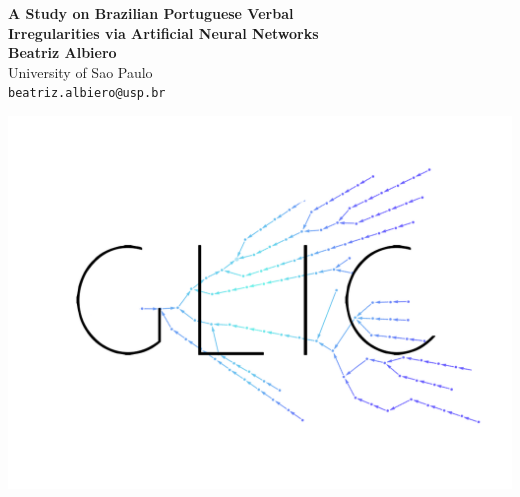 \documentclass[a0,portrait]{a0poster}
\begin{document}


\begin{minipage}[b]{0.70\linewidth}
\veryHuge \color{DB} \textbf{A  Study  on  Brazilian  Portuguese  Verbal\\  Irregularities  via  Artificial  Neural  Networks } \color{black} \vspace{1cm}
\\ %
\huge \textbf{Beatriz Albiero}\\[0.5cm] %
\huge University of Sao Paulo \\[0.4cm] %
\Large \texttt{beatriz.albiero@usp.br}\\
\end{minipage}
%
\begin{minipage}[b]{0.12\linewidth}
\includegraphics[width=1.4\textwidth]{Glic_Transparente.png}\\
\end{minipage}
\hspace{3cm}
\end{document}
